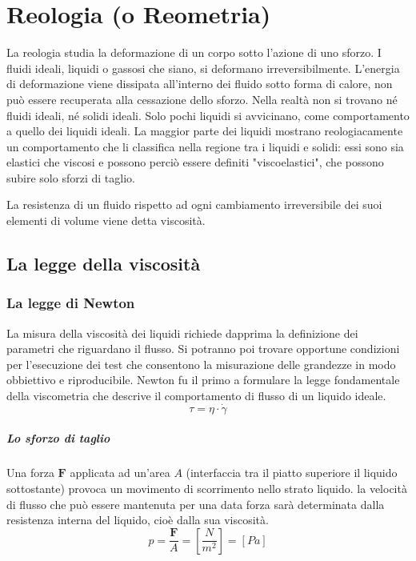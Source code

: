 \chapter{Reologia (o Reometria)}\label{chp:Reologia}
La reologia studia la deformazione di un corpo sotto l'azione di uno sforzo.
I fluidi ideali, liquidi o gassosi che siano, si deformano irreversibilmente. L'energia di deformazione viene dissipata all'interno dei fluido sotto forma di calore, non può essere recuperata alla cessazione dello sforzo. Nella realtà non si trovano né fluidi ideali, né solidi ideali.
Solo pochi liquidi si avvicinano, come comportamento a quello dei liquidi ideali. La maggior parte dei liquidi mostrano reologiacamente un comportamento che li classifica nella regione tra i liquidi e solidi: essi sono sia elastici che viscosi e possono perciò essere definiti "viscoelastici", che possono subire solo sforzi di taglio.

La resistenza di un fluido rispetto ad ogni cambiamento irreversibile dei suoi elementi di volume viene detta viscosità.

\section{La legge della viscosità}
\subsection{La legge di Newton}
La misura della viscosità dei liquidi richiede dapprima la definizione dei parametri che riguardano il flusso. Si potranno poi trovare opportune condizioni per l'esecuzione dei test che consentono la misurazione delle grandezze in modo obbiettivo e riproducibile.
Newton fu il primo a formulare la legge fondamentale della viscometria che descrive il comportamento di flusso di un liquido ideale.
\begin{equation}
\tau = \eta \cdot \dot{\gamma}
\label{eqn:1LeggeNewton}
\end{equation}

\paragraph{Lo sforzo di taglio}
Una forza $\mathbf{F}$ applicata ad un'area $A$ (interfaccia tra il piatto superiore il liquido sottostante) provoca un movimento di scorrimento nello strato liquido. la velocità di flusso che può essere mantenuta per una data forza sarà determinata dalla resistenza interna del liquido, cioè dalla sua viscosità.
\begin{equation}
p = \frac{\mathbf{F}}{A} = \left[\frac{N}{m^2}\right] = \left[Pa\right]
\end{equation}


